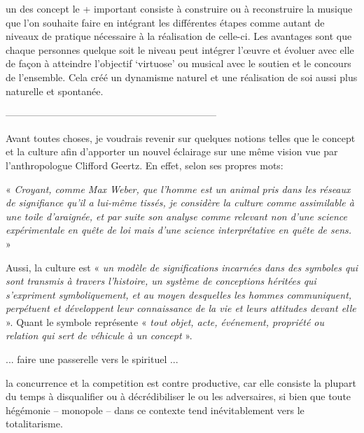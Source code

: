 \documentclass{article}
\begin{document}
un des concept le + important consiste à construire ou à reconstruire la musique que l'on souhaite faire en intégrant les différentes étapes comme autant de niveaux de pratique nécessaire à la réalisation de celle-ci. Les avantages sont que chaque personnes quelque soit le niveau peut intégrer l'œuvre et évoluer avec elle de façon à atteindre l'objectif `virtuose' ou musical avec le soutien et le concours de l'ensemble. Cela créé un dynamisme naturel et une réalisation de soi aussi plus naturelle et spontanée.

-----------------------------------------------------------------

Avant toutes choses, je voudrais revenir sur quelques notions telles que le concept et la culture afin d'apporter un nouvel éclairage sur une même vision vue par l'anthropologue Clifford Geertz. En effet, selon ses propres mots: 

 « \textit{Croyant, comme Max Weber, que l’homme est un animal pris dans les réseaux de signifiance qu’il a lui-même tissés, je considère la culture comme assimilable à une toile d’araignée, et par suite son analyse comme relevant non d’une science expérimentale en quête de loi mais d’une science interprétative en quête de sens.} »

Aussi, la culture est « \textit{un modèle de significations incarnées dans des symboles qui sont transmis à travers l'histoire, un système de conceptions héritées qui s'expriment symboliquement, et au moyen desquelles les hommes communiquent, perpétuent et développent leur connaissance de la vie et leurs attitudes devant elle} ». Quant le symbole représente « \textit{tout objet, acte, événement, propriété ou relation qui sert de véhicule à un concept} ».

\bigskip

... faire une passerelle vers le spirituel ...

\bigskip


la concurrence et la competition est contre productive, car elle consiste la plupart du temps à disqualifier ou à décrédibiliser le ou les adversaires, si bien que toute hégémonie -- monopole -- dans ce contexte tend inévitablement vers le totalitarisme.
\end{document}
